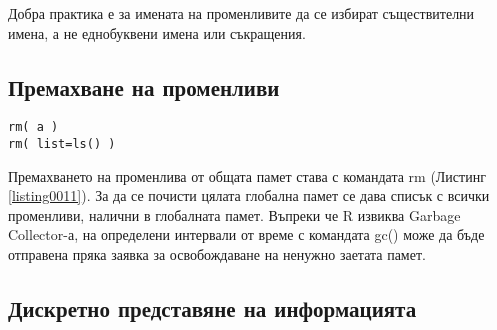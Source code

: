Добра практика е за имената на променливите да се избират съществителни имена, а не еднобуквени имена или съкращения. 

\subsection{Премахване на променливи}

\begin{lstlisting}[caption=Премахване на променливи от глобалната памет, label=listing0011]
rm( a )
rm( list=ls() )
\end{lstlisting}

Премахването на променлива от общата памет става с командата rm (Листинг \ref{listing0011}). За да се почисти цялата глобална памет се дава списък с всички променливи, налични в глобалната памет. Въпреки че R извиква Garbage Collector-а, на определени интервали от време с командата gc() може да бъде отправена пряка заявка за освобождаване на ненужно заетата памет.

\subsection{Дискретно представяне на информацията}

